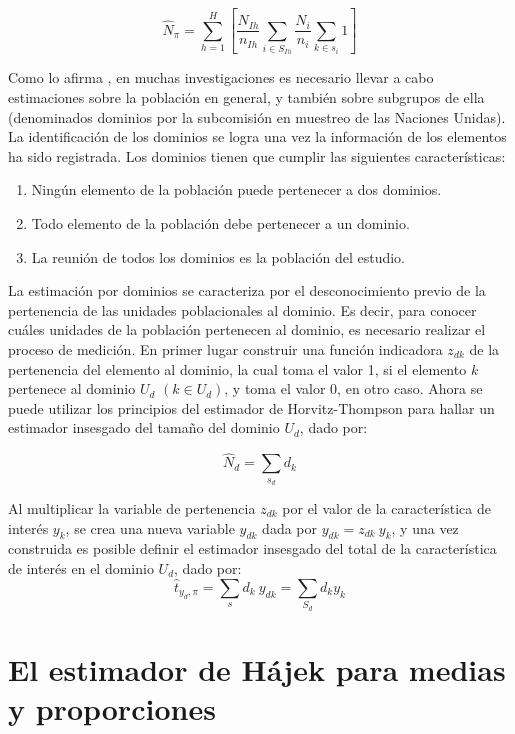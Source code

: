 \documentclass[
  12pt,
  spanish,
]{book}
\providecommand{\tightlist}{%
  \setlength{\itemsep}{0pt}\setlength{\parskip}{0pt}}
\begin{document}
\[
\hat{N}_{\pi}=\sum_{h=1}^H\left[\frac{N_{Ih}}{n_{Ih}}\sum_{i\in S_{Ih}}\frac{N_i}{n_i}\sum_{k\in s_i}1\right]
\]

Como lo afirma \citet{Gutierrez_2016}, en muchas investigaciones es necesario llevar a cabo estimaciones sobre la población en general, y también sobre subgrupos de ella (denominados dominios por la subcomisión en muestreo de las Naciones Unidas). La identificación de los dominios se logra una vez la información de los elementos ha sido registrada. Los dominios tienen que cumplir las siguientes características:

\begin{enumerate}
\def\labelenumi{\arabic{enumi}.}
\tightlist
\item
  Ningún elemento de la población puede pertenecer a dos dominios.
\item
  Todo elemento de la población debe pertenecer a un dominio.
\item
  La reunión de todos los dominios es la población del estudio.
\end{enumerate}

La estimación por dominios se caracteriza por el desconocimiento previo de la pertenencia de las unidades poblacionales al dominio. Es decir, para conocer cuáles unidades de la población pertenecen al dominio, es necesario realizar el proceso de medición. En primer lugar construir una función indicadora \(z_{dk}\) de la pertenencia del elemento al dominio, la cual toma el valor 1, si el elemento \(k\) pertenece al dominio \(U_d\) \((k\in U_d)\), y toma el valor 0, en otro caso. Ahora se puede utilizar los principios del estimador de Horvitz-Thompson para hallar un estimador insesgado del tamaño del dominio \(U_d\), dado por:

\[
\hat{N}_d = \sum_{s_d} d_k 
\]

Al multiplicar la variable de pertenencia \(z_{dk}\) por el valor de la característica de interés \(y_k\), se crea una nueva variable \(y_{dk}\) dada por \(y_{dk}=z_{dk} \ y_k\), y una vez construida es posible definir el estimador insesgado del total de la característica de interés en el dominio \(U_d\), dado por:
\[
\hat{t}_{y_d,\pi}=\sum_sd_k\ y_{dk}=\sum_{S_d}d_ky_k
\]

\hypertarget{el-estimador-de-huxe1jek-para-medias-y-proporciones}{%
\section{El estimador de Hájek para medias y proporciones}\label{el-estimador-de-huxe1jek-para-medias-y-proporciones}}
\end{document}

